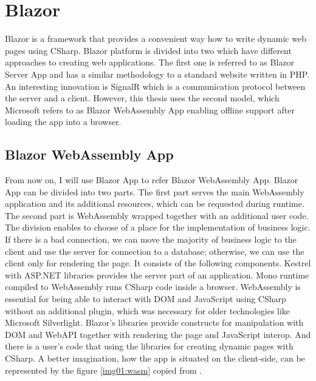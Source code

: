 \section{Blazor}

Blazor is a framework that provides a convenient way how to write dynamic web pages using CSharp.
Blazor platform is divided into two \cite{Hosting_models} which have different approaches to creating web applications. 
The first one is referred to as Blazor Server App and has a similar methodology to a standard website written in PHP.
An interesting innovation is SignalR which is a communication protocol between the server and a client.
However, this thesis uses the second model, which Microsoft refers to as Blazor WebAssembly App enabling offline support after loading the app into a browser.

\subsection{Blazor WebAssembly App}
From now on, I will use Blazor App to refer Blazor WebAssembly App.
Blazor App can be divided into two parts.
The first part serves the main WebAssembly application and its additional resources, which can be requested during runtime.
The second part is WebAssembly wrapped together with an additional user code.
The division enables to choose of a place for the implementation of business logic.
If there is a bad connection, we can move the majority of business logic to the client and use the server for connection to a database; otherwise, we can use the client only for rendering the page. It consists of the following components. 
Kestrel with ASP.NET libraries provides the server part of an application.
Mono runtime compiled to WebAssembly runs CSharp code inside a browser.
WebAssembly is essential for being able to interact with DOM and JavaScript using CSharp without an additional plugin, which was necessary for older technologies like Microsoft Silverlight.
Blazor's libraries provide constructs for manipulation with DOM and WebAPI together with rendering the page and JavaScript interop.
And there is a user's code that using the libraries for creating dynamic pages with CSharp.
A better imagination, how the app is situated on the client-side, can be represented by the figure \ref{img01:wasm} copied from \cite{Glick2018}.

